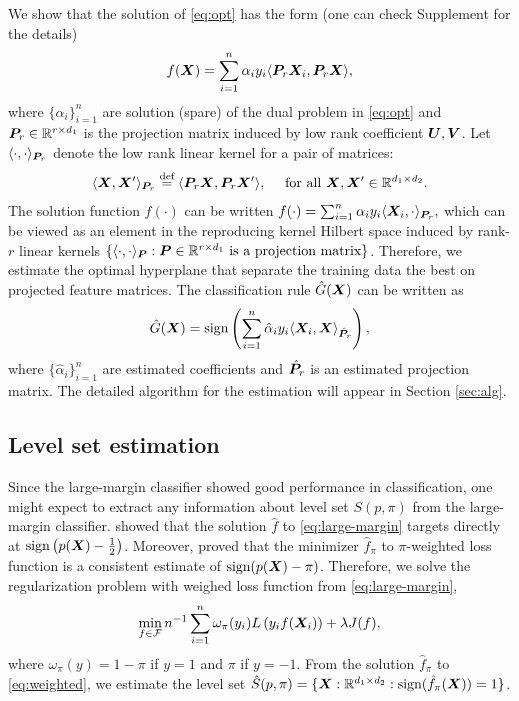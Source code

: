 \documentclass[12pt]{article}
\begin{document}
We show that the solution of \eqref{eq:opt} has the form  (one can check Supplement for the details)
\begin{align}\label{eq:form}
f(\bm X) = \sum_{i=1}^n \alpha_i y_i\langle \bm{P}_r\bm X_i, \bm{P}_r \bm X\rangle,
\end{align}
where $\{\alpha_i\}_{i=1}^n$ are  solution  (spare)  of the dual problem in \eqref{eq:opt} and $\bm{P}_r\in\mathbb{R}^{r\times d_1}$ is the projection matrix induced by low rank coefficient $\bm{U},\bm{V}$. Let $\langle \cdot,\cdot\rangle_{\bm{P}_r}$ denote the low rank linear kernel for a pair of matrices:
\begin{align}\label{eq:linear kernel}
\langle \bm X,\bm X'\rangle_{\bm{P}_r} \stackrel{\text{def}}{=}\langle \bm{P}_r\bm X,\bm{P}_r\bm X'\rangle, \quad\text{ for all } \bm X,\bm X'\in\mathbb{R}^{d_1\times d_2}.
\end{align}
The solution function $f(\cdot)$ can be written $f(\cdot) = \sum_{i=1}^n \alpha_iy_i\langle\bm X_i,\cdot\rangle_{\bm{P}_r},$ which can be viewed as an element in the reproducing kernel Hilbert space induced by rank-$r$ linear kernels $\{\langle \cdot,\cdot\rangle_{\bm{P}}: \bm{P}\in\mathbb{R}^{r\times d_1}\text{ is a projection matrix} \}$.  
Therefore, we estimate the optimal hyperplane that separate the training data the best on projected feature matrices.  The classification rule $\hat G(\bm X)$ can be written as \begin{align}
\hat G(\bm X) = \text{sign}\left(\sum_{i=1}^n \hat \alpha_i y_i\langle \bm X_i,\bm X\rangle_{\hat {\bm{P}}_r}\right),
\end{align}
where  $\{\hat \alpha_i\}_{i=1}^n$ are estimated coefficients and $\hat {\bm{P}}_r$ is an estimated projection matrix.
The detailed algorithm for the estimation will appear in Section \ref{sec:alg}. 

\subsection{Level set estimation}
\label{subsec:pb2}
Since the large-margin classifier showed good performance in classification, one might expect to extract any information about level set $S(p,\pi)$ from the large-margin classifier. \citet{lin2002support} showed that the solution $\hat f$ to \eqref{eq:large-margin} targets directly at $\text{sign}\left(p(\bm X)-\frac{1}{2}\right)$. Moreover, \citet{wang2008probability} proved that the minimizer $\hat f_\pi$ to $\pi$-weighted loss function is a consistent estimate of $\text{sign}(p(\bm X)-\pi)$. 
Therefore, we solve the regularization problem with weighed loss function from  \eqref{eq:large-margin},
\begin{align}
\label{eq:weighted}
\min_{f\in\mathcal{F}}n^{-1}\sum_{i=1}^n \omega_{\pi}(y_i)L\left(y_if(\bm X_i)\right)+ \lambda J(f),
\end{align}
where $\omega_\pi(y) = 1-\pi $ if $y = 1$ and $\pi$ if $y = -1$.  From the solution $\hat f_\pi$ to \eqref{eq:weighted}, we estimate the level set $\hat S(p,\pi) = \{\bm X:\mathbb{R}^{d_1\times d_2} : \text{sign}(\hat f_\pi(\bm X)) = 1\}$.
\end{document}
